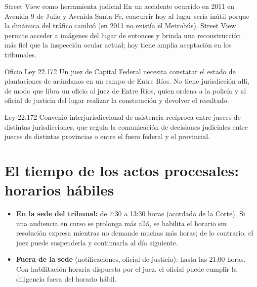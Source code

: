 \documentclass[12pt,oneside]{book}
\begin{document}
\begin{example}{Street View como herramienta judicial}
En un accidente ocurrido en 2011 en Avenida 9 de Julio y Avenida Santa Fe, concurrir hoy al lugar sería inútil porque la dinámica del tráfico cambió (en 2011 no existía el Metrobús). Street View permite acceder a imágenes del lugar de entonces y brinda una reconstrucción más fiel que la inspección ocular actual; hoy tiene amplia aceptación en los tribunales.
\end{example}

\begin{example}{Oficio Ley 22.172}
Un juez de Capital Federal necesita constatar el estado de plantaciones de arándanos en un campo de Entre Ríos. No tiene jurisdicción allí, de modo que libra un oficio al juez de Entre Ríos, quien ordena a la policía y al oficial de justicia del lugar realizar la constatación y devolver el resultado.
\end{example}

\begin{definition}{Ley 22.172}
Convenio interjurisdiccional de asistencia recíproca entre jueces de distintas jurisdicciones, que regula la comunicación de decisiones judiciales entre jueces de distintas provincias o entre el fuero federal y el provincial.
\end{definition}

\section{El tiempo de los actos procesales: horarios hábiles}

\begin{itemize}
\item \textbf{En la sede del tribunal:} de 7:30 a 13:30 horas (acordada de la Corte). Si una audiencia en curso se prolonga más allá, se habilita el horario sin resolución expresa mientras no demande muchas más horas; de lo contrario, el juez puede suspenderla y continuarla al día siguiente.
\item \textbf{Fuera de la sede} (notificaciones, oficial de justicia): hasta las 21:00 horas. Con habilitación horaria dispuesta por el juez, el oficial puede cumplir la diligencia fuera del horario hábil.
\end{itemize}
\end{document}
